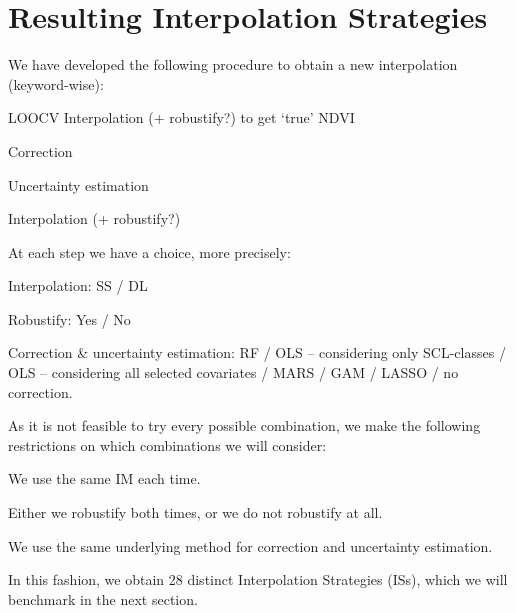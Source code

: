 \section{Resulting Interpolation Strategies}{
    \label{sec:corr_itpl_stat}
    We have developed the following procedure to obtain a new interpolation (keyword-wise):
    \begin{Nenumerate}
        \item LOOCV Interpolation (+ robustify?) to get `true' NDVI
        \item Correction 
        \item Uncertainty estimation
        \item Interpolation (+ robustify?)
    \end{Nenumerate}
    At each step we have a choice, more precisely:
    \begin{Nitemize}
        \item Interpolation: SS / DL
        \item Robustify: Yes / No
        \item Correction \& uncertainty estimation: RF / OLS -- considering only SCL-classes / OLS -- considering all selected covariates / MARS / GAM / LASSO / no correction.
    \end{Nitemize}
    As it is not feasible to try every possible combination, we make the following restrictions on which combinations we will consider:
    \begin{Nitemize}
        \item We use the same {{IM}} each time.
        \item Either we robustify both times, or we do not robustify at all.
        \item We use the same underlying method for correction and uncertainty estimation.
    \end{Nitemize}

    In this fashion, we obtain 28 distinct Interpolation Strategies ({{IS}}s), which we will benchmark in the next section.
}

